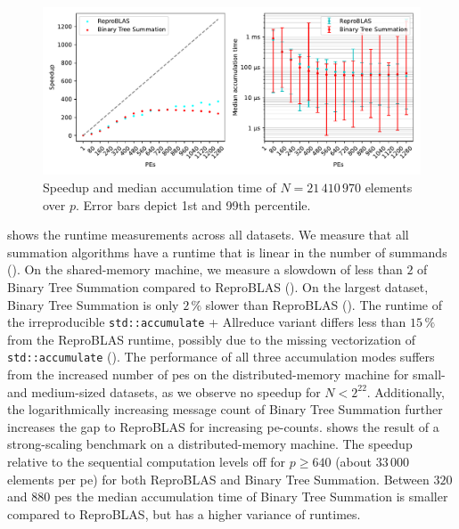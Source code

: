 \begin{figure}
\centering
\includegraphics[scale=0.72]{figures/scaling.pdf}
\caption[Speedup and median accumulation time of $N=21\,410\,970$ elements over $p$.]{Speedup and median accumulation time of $N=21\,410\,970$ elements over $p$. Error bars depict 1st and 99th percentile.}
\label{fig:ClusterScaling}
\end{figure}


 shows the runtime measurements across all datasets.
We measure that all summation algorithms have a runtime that is linear in the number of summands ().
On the shared-memory machine, we measure a slowdown of less than $2$ of Binary Tree Summation compared to ReproBLAS ().
On the largest dataset, Binary Tree Summation is only $2\,\%$ slower than ReproBLAS ().
The runtime of the irreproducible \texttt{std::accumulate} + Allreduce variant differs less than $15\,\%$ from the ReproBLAS runtime, possibly due to the missing vectorization of \texttt{std::accumulate} ().
The performance of all three accumulation modes suffers from the increased number of \glspl{pe} on the distributed-memory machine for small- and medium-sized datasets, as we observe no speedup for $N < 2^{22}$.
Additionally, the logarithmically increasing message count of Binary Tree Summation further increases the gap to ReproBLAS for increasing \gls{pe}-counts.\@
{} shows the result of a strong-scaling benchmark on a distributed-memory machine.
The speedup relative to the sequential computation levels off for $p \geq 640$ (about $33\,000$ elements per \gls{pe}) for both ReproBLAS and Binary Tree Summation.
Between $320$ and $880$ \glspl{pe} the median accumulation time of Binary Tree Summation is smaller compared to ReproBLAS, but has a higher variance of runtimes.



